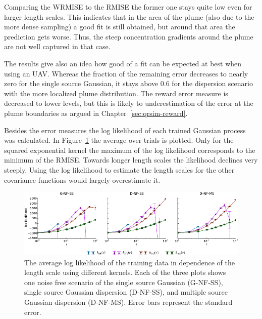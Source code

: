 Comparing the WRMISE to the RMISE the former one stays quite low even for larger 
length scales. This indicates that in the area of the plume (also due to the more 
dense sampling) a good fit is still obtained, but around that area the 
prediction gets worse. Thus, the steep concentration gradients around the plume 
are not well captured in that case.

The results give also an idea how good of a fit can be expected at best when 
using an UAV\@. Whereas the fraction of the remaining error decreases to nearly 
zero for the single source Gaussian, it stays above 0.6 for the dispersion 
scenario with the more localized plume distribution. The reward error measure is 
decreased to lower levels, but this is likely to underestimation of the error at 
the plume boundaries as argued in Chapter~\ref{sec:qrsim-reward}.

Besides the error measures the log likelihood of each trained Gaussian process 
was calculated. In Figure~\ref{fig:loglikelihood} the average over trials is 
plotted. Only for the squared exponential kernel the maximum of the log 
likelihood corresponds to the minimum of the RMISE\@. Towards longer length 
scales the likelihood declines very steeply. Using the log likelihood to 
estimate the length scales for the other covariance functions would largely 
overestimate it.

\begin{figure}
    \centering
    \includegraphics{plots/loglikelihood}
    \caption[Log likelihood in dependence of the kernel lengthscale]{The average 
        log likelihood of the training data in dependence of the length scale 
        using different kernels.  Each of the three plots shows one noise free 
        scenario of the single source Gaussian (G-NF-SS), single source Gaussian 
        dispersion (D-NF-SS), and multiple source Gaussian dispersion (D-NF-MS).  
        Error bars represent the standard error.}\label{fig:loglikelihood}
\end{figure}

